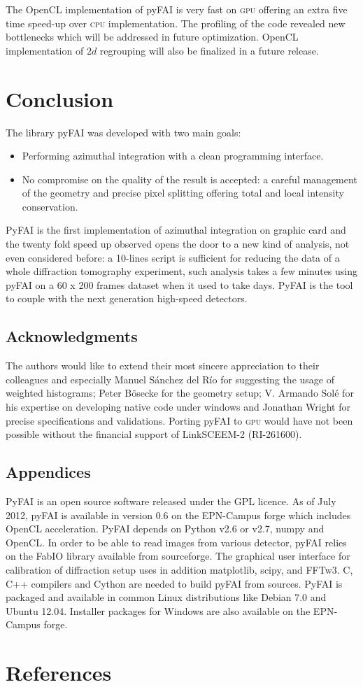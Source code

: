 \documentclass[a4paper]{jpconf}
\begin{document}
The OpenCL implementation of pyFAI is very fast on \textsc{gpu} offering an extra five
time speed-up over \textsc{cpu} implementation. The profiling of the code revealed new
bottlenecks which will be addressed in future optimization. OpenCL
implementation of $2d$ regrouping will also be finalized in a future release.

\section{Conclusion}
The library pyFAI was developed with two main goals:
\begin{itemize}
\item Performing azimuthal integration with a clean programming interface.
\item No compromise on the quality of the result is accepted: a careful
management of the geometry and precise pixel splitting offering total and local intensity
conservation.
\end{itemize}
PyFAI is the first implementation of azimuthal integration on
graphic card and the twenty fold speed up observed opens the
door to a new kind of analysis, not even considered before:
a 10-lines script is sufficient for reducing the data of a whole diffraction
tomography experiment, such analysis takes a few minutes using pyFAI on
a 60 x 200 frames dataset when it used to take days.
PyFAI is the tool to couple with the next generation high-speed detectors.

\subsection*{Acknowledgments}
The authors would like to extend their most sincere appreciation to their
colleagues and especially Manuel S\'anchez del R\'io for suggesting
the usage of weighted histograms; Peter B\"osecke for the geometry setup;
V. Armando Sol\'e for his expertise on developing native code under windows and
Jonathan Wright for precise specifications and validations. Porting
pyFAI to \textsc{gpu} would have not been possible without the financial
support of LinkSCEEM-2 (RI-261600).

\subsection*{Appendices}
PyFAI is an open source software released under the GPL licence.
As of July 2012, pyFAI is available in version 0.6 on the EPN-Campus
forge\cite{forge} which includes OpenCL acceleration.
PyFAI depends on Python v2.6 or v2.7, numpy\cite{numpy} and OpenCL\cite{opencl}.
In order to be able to read images from various detector, pyFAI relies on the
FabIO\cite{fabio} library available from sourceforge. The graphical user
interface for calibration of diffraction setup uses in addition
matplotlib\cite{matplotlib}, scipy\cite{scipy}, and FFTw3\cite{fftw}.
C, C++ compilers and Cython\cite{cython} are needed to build pyFAI from
sources.
PyFAI is packaged and available in common Linux distributions like Debian
7.0 and Ubuntu 12.04. Installer packages for Windows are also
available on the EPN-Campus forge.

\section*{References}


\end{document}
